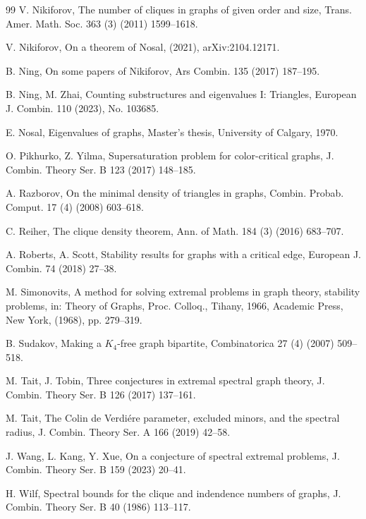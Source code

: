 \documentclass[11pt]{article}
\begin{document}
\begin{thebibliography}{99}
V. Nikiforov, 
The number of cliques in graphs of given order and size, 
Trans. Amer. Math. Soc. 363 (3) (2011) 1599--1618. 

 V. Nikiforov,  On a theorem of Nosal, 
 (2021), arXiv:2104.12171. 
 

 B. Ning, On some papers of Nikiforov, 
 Ars Combin. 135 (2017) 187--195. 
 
 
B. Ning, M. Zhai, Counting substructures and eigenvalues I: Triangles, 
European J. Combin.  110 (2023), No. 103685. 

E. Nosal, Eigenvalues of graphs, Master's thesis, University of Calgary, 1970.


O. Pikhurko, Z. Yilma, 
Supersaturation problem for color-critical graphs, 
J. Combin. Theory Ser. B 123 (2017) 148--185.

 A. Razborov, 
 On the minimal density of triangles in graphs, 
 Combin. Probab. Comput. 17 (4) (2008) 603--618. 
 
 
 C. Reiher, The clique density theorem, 
 Ann. of Math. 184 (3) (2016) 683--707.
 
 
A. Roberts, A. Scott, 
Stability results for graphs with a critical edge, 
European J. Combin. 74 (2018) 27--38.
 
 
M. Simonovits, 
A method for solving extremal problems in graph theory, 
stability problems, in: Theory of Graphs, 
Proc. Colloq., Tihany, 1966, Academic Press, New York, (1968), pp. 279--319. 

B. Sudakov, 
Making a $K_4$-free graph bipartite, 
Combinatorica 27 (4) (2007) 509--518. 

M. Tait, J. Tobin,
Three conjectures in extremal spectral graph theory,
J. Combin. Theory Ser. B 126 (2017) 137--161.



M. Tait, 
The Colin de Verdi\'{e}re parameter, excluded minors, and the spectral radius, 
J. Combin. Theory Ser. A 166 (2019) 42--58.


J. Wang, L. Kang, Y. Xue, 
On a conjecture of spectral extremal problems, 
J. Combin. Theory Ser. B 159 (2023) 20--41.  


H. Wilf, 
Spectral bounds for the clique and indendence numbers of graphs, 
J. Combin. Theory Ser. B 40 (1986) 113--117.  



\end{thebibliography}
\end{document}
